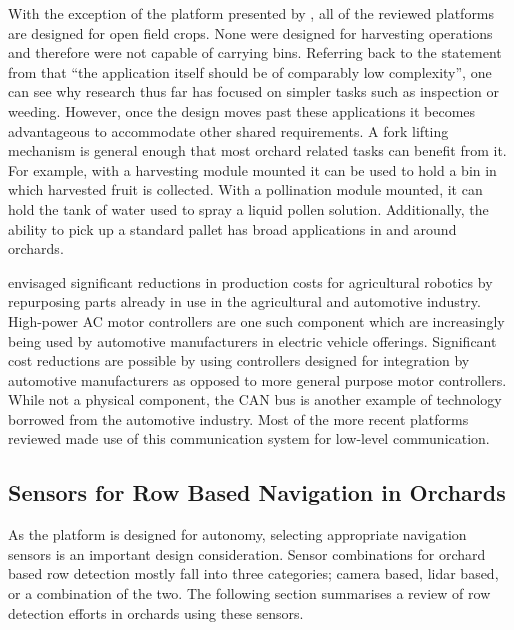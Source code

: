 \documentclass[preprint,authoryear,12pt]{elsarticle}
\begin{document}
        With the exception of the platform presented by \cite{Scarfe2012}, all of the reviewed platforms are designed for open field crops.
        None were designed for harvesting operations and therefore were not capable of carrying bins.
        Referring back to the statement from \cite{Ruckelshausen2009} that ``the application itself should be of comparably low complexity'', one can see why research thus far has focused on simpler tasks such as inspection or weeding.
        However, once the design moves past these applications it becomes advantageous to accommodate other shared requirements.
        A fork lifting mechanism is general enough that most orchard related tasks can benefit from it.
        For example, with a harvesting module mounted it can be used to hold a bin in which harvested fruit is collected.
        With a pollination module mounted, it can hold the tank of water used to spray a liquid pollen solution.
        Additionally, the ability to pick up a standard pallet has broad applications in and around orchards.

        \cite{Blackmore2007} envisaged significant reductions in production costs for agricultural robotics by repurposing parts already in use in the agricultural and automotive industry.
        High-power AC motor controllers are one such component which are increasingly being used by automotive manufacturers in electric vehicle offerings.
        Significant cost reductions are possible by using controllers designed for integration by automotive manufacturers as opposed to more general purpose motor controllers.
        While not a physical component, the CAN bus is another example of technology borrowed from the automotive industry.
        Most of the more recent platforms reviewed made use of this communication system for low-level communication.

    \subsection{Sensors for Row Based Navigation in Orchards}

        As the platform is designed for autonomy, selecting appropriate navigation sensors is an important design consideration.
        Sensor combinations for orchard based row detection mostly fall into three categories; camera based, lidar based, or a combination of the two.
        The following section summarises a review of row detection efforts in orchards using these sensors.
\end{document}
